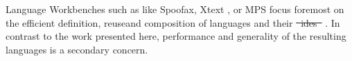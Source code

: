 \documentclass[sigplan,10pt,review,anonymous]{acmart}
\makeatletter
\renewcommand\subparagraph{\@startsection{subparagraph}{5}{\z@}%
   {-.2\baselineskip \@plus -2\p@ \@minus -.2\p@}%
   {-3.5\p@}%
   {\@subparfont\@addspaceafter}} %
\providecommand{\DIFadd}[1]{{\protect\color{blue}\uwave{#1}}} %
\providecommand{\DIFdel}[1]{{\protect\color{red}\sout{#1}}}                      %
\providecommand{\DIFaddbegin}{} %
\providecommand{\DIFaddend}{} %
\providecommand{\DIFdelbegin}{} %
\providecommand{\DIFdelend}{} %
\makeatother
\begin{document}
\DIFdelend Language Workbenches such as like Spoofax\DIFaddbegin \DIFadd{~}\DIFaddend \cite{kats2010spoofax}, Xtext
\cite{eysholdt2010xtext}, or MPS\DIFaddbegin \DIFadd{~}\DIFaddend \cite{voelter2012language} focus foremost on
the efficient definition, reuse\DIFaddbegin \DIFadd{, }\DIFaddend and composition of languages and their
\DIFdelbegin \DIFdel{\mbox{%
\acp{ide} }\hspace{0pt}%
}\DIFdelend \DIFaddbegin \DIFadd{\acs{ide}s~}\DIFaddend \cite{erdweg2013state}. In contrast to the work presented here,
performance and generality of the resulting languages is a secondary concern.
\DIFdelbegin %


\DIFdelend 
\end{document}
